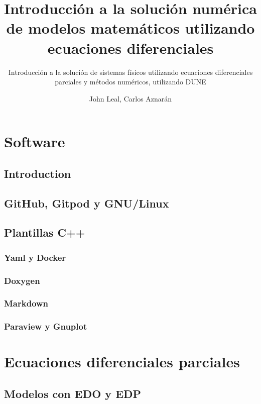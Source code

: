 \documentclass[10pt,
	a4paper,
	spanish,
	titlepage=firstiscover,
	titlepage=true,
	BCOR=2cm,
	DIV=12
]{scrbook}
\author{John Leal, Carlos Aznarán}
\title{Introducción a la solución numérica de modelos matemáticos utilizando ecuaciones 
	diferenciales}
\subtitle{Introducción a la solución de sistemas físicos utilizando ecuaciones diferenciales 
	parciales y métodos numéricos, utilizando DUNE}
\begin{document}

\tableofcontents

\begin{refsection}
	\part{Software} %
	\chapter{Introduction}
	\chapter{GitHub, Gitpod y GNU/Linux}
	
	\chapter{Plantillas C++}
	\section{Yaml y Docker}
	\section{Doxygen}
	\section{Markdown}
	\section{Paraview y Gnuplot}
	\part{Ecuaciones diferenciales parciales} %
	\chapter{Modelos con EDO y EDP}
	

\end{refsection}
\end{document}
